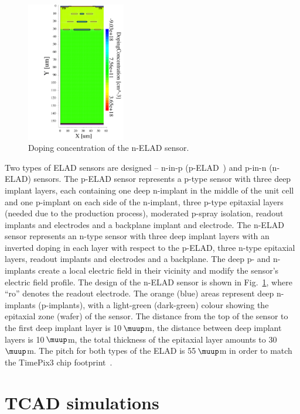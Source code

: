 \documentclass[a4paper,11pt]{article}
\begin{document}
\begin{figure}[t]
  \centering
  \includegraphics[height=6.1cm]{figures/nelad2.pdf}
  \caption{Doping concentration of the n-ELAD sensor.}
  \label{fig:geom}
\end{figure}

Two types of ELAD sensors are designed -- n-in-p (p-ELAD~\cite{elad}) and p-in-n (n-ELAD) sensors. 
The p-ELAD sensor represents a p-type sensor with three deep implant layers, each containing one deep n-implant in the middle of the unit cell and one p-implant on each side of the n-implant,
 three p-type epitaxial layers (needed due to the production process), moderated p-spray isolation, readout implants and electrodes and a backplane implant and electrode.
The n-ELAD sensor represents an n-type sensor with three deep implant layers with an inverted doping in each layer with respect to the p-ELAD, three n-type epitaxial layers, readout implants and electrodes and a backplane.
The deep p- and n-implants create a local electric field in their vicinity and modify the sensor's electric field profile.
The design of the n-ELAD sensor is shown in Fig.~\ref{fig:geom}, where ``ro'' denotes the readout electrode.
The orange (blue) areas represent deep n-implants (p-implants), with a light-green (dark-green) colour showing the epitaxial zone (wafer) of the sensor. 
The distance from the top of the sensor to the first deep implant layer is 10\,$\muup$m, the distance between deep implant layers is 10\,$\muup$m, the total thickness of the epitaxial layer amounts to 30\,$\muup$m.
The pitch for both types of the ELAD is 55\,$\muup$m in order to match the TimePix3 chip footprint~\cite{tp3}.


\section{TCAD simulations}
\label{sec:sim}
\end{document}
